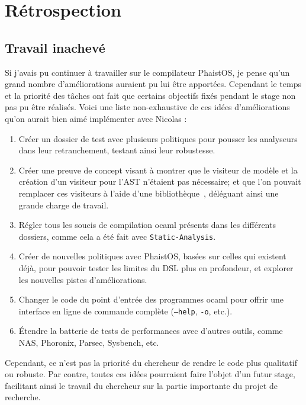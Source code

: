 \section{Rétrospection}
\label{hindsight}

\subsection{Travail inachevé}

Si j'avais pu continuer à travailler sur le compilateur PhaistOS, je pense qu'un grand nombre d'améliorations auraient pu lui être apportées. Cependant le temps et la priorité des tâches ont fait que certains objectifs fixés pendant le stage non pas pu être réalisés. Voici une liste non-exhaustive de ces idées d'améliorations qu'on aurait bien aimé implémenter avec Nicolas :

\begin{enumerate}
    \item Créer un dossier de test avec plusieurs politiques pour pousser les 
    analyseurs dans leur retranchement, testant ainsi leur robustesse.
    \item Créer une preuve de concept visant à montrer que le visiteur de 
    modèle et la création d'un visiteur pour l'AST n'étaient pas nécessaire; et 
    que l'on pouvait remplacer ces visiteurs à l'aide d'une bibliothèque~\cite
    {visitors2021manual}, 
    déléguant ainsi une grande charge de travail.
    \item Régler tous les soucis de compilation ocaml présents dans les 
    différents dossiers, comme cela a été fait avec \texttt{Static-Analysis}.
    \item Créer de nouvelles politiques avec PhaistOS, basées sur celles qui 
    existent déjà, pour pouvoir tester les limites du DSL plus en profondeur, 
    et explorer les nouvelles pistes d'améliorations.
    \item Changer le code du point d'entrée des programmes ocaml pour offrir 
    une interface en ligne de commande complète (\texttt{--help}, \texttt{-o}, 
    etc.).
    \item Étendre la batterie de tests de performances avec d'autres outils, 
    comme NAS, Phoronix, Parsec, Sysbench, etc.
\end{enumerate}

Cependant, ce n'est pas la priorité du chercheur de rendre le code plus 
qualitatif ou robuste. Par contre, toutes ces idées pourraient faire l'objet 
d'un futur stage, facilitant ainsi le travail du chercheur sur la partie 
importante du projet de recherche. 

